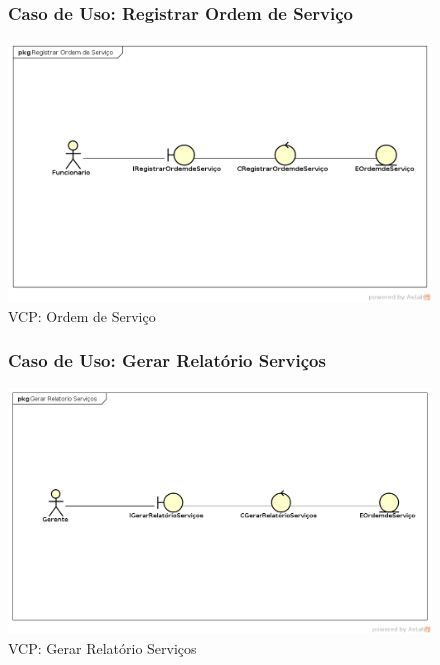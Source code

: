 \documentclass[
	12pt,				%
	openright,
	oneside,			%
	a4paper,			%
	chapter=TITLE,		%
	brazil				%
	]{abntex2}
\begin{document}
\begin{figure}[h!]

\subsubsection*{Caso de Uso: Registrar Ordem de Serviço}

	\caption{VCP: Ordem de Serviço}
	\begin{center}
	    \includegraphics[scale=0.5]{Arquivos/Analise/V_registrar_ordem_servico}  
	\end{center}
\end{figure}






\begin{figure}[h!]

\subsubsection*{Caso de Uso: Gerar Relatório Serviços}

	\caption{VCP: Gerar Relatório Serviços}
	\begin{center}
	    \includegraphics[scale=0.5]{Arquivos/Analise/V_relatorio_servicos}  
	\end{center}
\end{figure}
\end{document}
